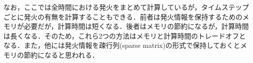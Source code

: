 なお，ここでは全時間における発火をまとめて計算しているが，タイムステップごとに発火の有無を計算することもできる．前者は発火情報を保持するためのメモリが必要だが，計算時間は短くなる．後者はメモリの節約になるが，計算時間は長くなる．そのため，これら2つの方法はメモリと計算時間のトレードオフとなる．また，他には発火情報を疎行列(sparse matrix)の形式で保持しておくとメモリの節約になると思われる．